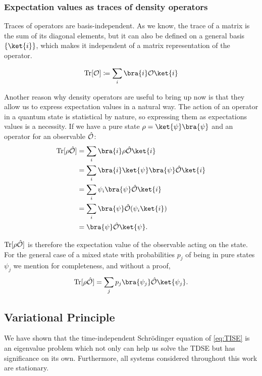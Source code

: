 \subsubsection{Expectation values as traces of density operators}

Traces of operators are basis-independent. As we know, the trace of a matrix is the sum of its diagonal elements, but it can also be defined on a general basis $\{\ket{i}\}$, which makes it independent of a matrix representation of the operator.

\begin{align*}
    \Tr{\mathcal{O}} \coloneqq \sum_i \bra{i}\mathcal{O}\ket{i}
\end{align*}

Another reason why density operators are useful to bring up now is that they allow us to express expectation values in a natural way. The action of an operator in a quantum state is statistical by nature, so expressing them as expectations values is a necessity. If we have a pure state $\rho = \ket{\psi} \bra{\psi}$ and an operator for an observable $\hat{\mathcal{O}}$:
\begin{align*}
    \Tr{\rho \op{O}} &= \sum_i \bra{i}\rho \op{O} \ket{i} \\
                &= \sum_i \bra{i}\ket{\psi} \bra{\psi} \op{O} \ket{i}\\
                &= \sum_i \psi_i \bra{\psi} \op{O} \ket{i}\\
                &= \sum_i  \bra{\psi} \op{O} (\psi_i \ket{i})\\
                &= \bra{\psi} \op{O} \ket{\psi}.
\end{align*}

$\text{Tr}[\rho \hat{\mathcal{O}}]$ is therefore the expectation value of the observable acting on the state. For the general case of a mixed state with probabilities $p_j$ of being in pure states $\psi_j$ we mention for completeness, and without a proof,
\begin{align*}
    \Tr{\rho \op{O}} = \sum_j p_j\bra{\psi_j} \op{O} \ket{\psi_j}.
\end{align*}

\subsection{Variational Principle}\label{sec:var_principle}

We have shown that the time-independent Schrödinger equation of \eqref{eq:TISE} is an eigenvalue problem which not only can help us solve the TDSE but has significance on its own. Furthermore, all systems considered throughout this work are stationary.

